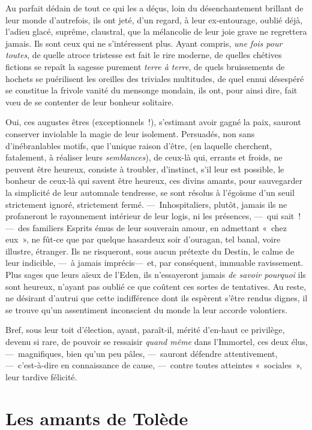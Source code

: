 \documentclass[french,twoside]{book} %
\begin{document}
Au parfait dédain de tout ce qui les a déçus, loin du désenchantement brillant de leur monde d’autrefois, ils ont jeté, d’un regard, à leur ex-entourage, oublié déjà, l’adieu glacé, suprême, claustral, que la mélancolie de leur joie grave ne regrettera jamais. Ils sont ceux qui ne s’intéressent plus. Ayant compris, \emph{une fois pour toutes}, de quelle atroce tristesse est fait le rire moderne, de quelles chétives fictions se repaît la sagesse purement \emph{terre à terre}, de quels bruissements de hochets se puérilisent les oreilles des triviales multitudes, de quel ennui désespéré se constitue la frivole vanité du mensonge   mondain, ils ont, pour ainsi dire, fait vœu de se contenter de leur bonheur solitaire.\par
Oui, ces augustes êtres (exceptionnels !), s’estimant avoir gagné la paix, sauront conserver inviolable la magie de leur isolement. Persuadés, non sans d’inébranlables motifs, que l’unique raison d’être, (en laquelle cherchent, fatalement, à réaliser leurs \emph{semblances}), de ceux-là qui, errants et froids, ne peuvent être heureux, consiste à troubler, d’instinct, s’il leur est possible, le bonheur de ceux-là qui savent être heureux, ces divins amants, pour sauvegarder la simplicité de leur automnale tendresse, se sont résolus à l’égoïsme d’un seuil strictement ignoré, strictement fermé. — Inhospitaliers, plutôt, jamais ils ne profaneront le rayonnement intérieur de leur logis, ni les présences, — qui sait ! — des familiers Esprits émus de leur souverain amour, en admettant « chez eux », ne fût-ce que par quelque hasardeux soir d’ouragan, tel banal, voire illustre, étranger. Ils ne risqueront, sous aucun prétexte du Destin, le calme de leur indicible, — à jamais imprécis— et, par conséquent, immuable   ravissement. Plus sages que leurs aïeux de l’Eden, ils n’essayeront jamais \emph{de savoir pourquoi} ils sont heureux, n’ayant pas oublié ce que coûtent ces sortes de tentatives. Au reste, ne désirant d’autrui que cette indifférence dont ils espèrent s’être rendus dignes, il se trouve qu’un assentiment inconscient du monde la leur accorde volontiers.\par
Bref, sous leur toit d’élection, ayant, paraît-il, mérité d’en-haut ce privilège, devenu si rare, de pouvoir se ressaisir \emph{quand même} dans l’Immortel, ces deux élus, — magnifiques, bien qu’un peu pâles, — sauront défendre attentivement, — c’est-à-dire en connaissance de cause, — contre toutes atteintes « sociales », leur tardive félicité.
 \section[{Les amants de Tolède}]{Les amants de Tolède}\renewcommand{\leftmark}{Les amants de Tolède}
\end{document}
